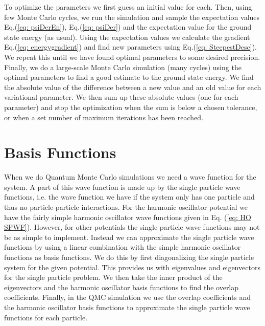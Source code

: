 \documentclass[../main.tex]{subfiles}
\begin{document}
To optimize the parameters we first guess an initial value for each. Then, using few Monte Carlo cycles, we run the simulation and sample the expectation values Eq.(\ref{eq: psiDerEn}), Eq.(\ref{eq: psiDer}) and the expectation value for the ground state energy (as usual). Using the expectation values we calculate the gradient Eq.(\ref{eq: energygradient}) and find new parameters using Eq.(\ref{eq: SteepestDesc}). We repeat this until we have found optimal parameters to some desired precision. Finally, we do a large-scale Monte Carlo simulation (many cycles) using the optimal parameters to find a good estimate to the ground state energy. We find the absolute value of the difference between a new value and an old value for each variational parameter. We then sum up these absolute values (one for each parameter) and stop the optimization when the sum is below a chosen tolerance, or when a set number of maximum iterations has been reached.




\chapter{Basis Functions}\label{sec: Basis Functions}

When we do Quantum Monte Carlo simulations we need a wave function for the system. A part of this wave function is made up by the single particle wave functions, i.e. the wave function we have if the system only has one particle and thus no particle-particle interactions. For the harmonic oscillator potential we have the fairly simple harmonic oscillator wave functions given in Eq. (\ref{eq: HO SPWF}). However, for other potentials the single particle wave functions may not be as simple to implement. Instead we can approximate the single particle wave functions by using a linear combination with the simple harmonic oscillator functions as basis functions. We do this by first diagonalizing the single particle system for the given potential. This provides us with eigenvalues and eigenvectors for the single particle problem. We then take the inner product of the eigenvectors and the harmonic oscillator basis functions to find the overlap coefficients. Finally, in the QMC simulation we use the overlap coefficients and the harmonic oscillator basis functions to approximate the single particle wave functions for each particle.
\end{document}
